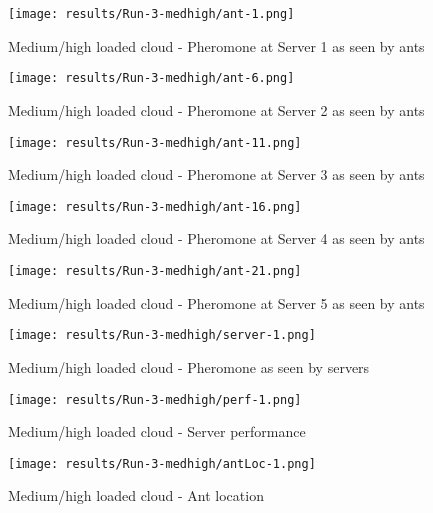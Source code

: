 \begin{figure}[!ht]
	\centering
		\texttt{[image: results/Run-3-medhigh/ant-1.png]}
	\caption{Medium/high loaded cloud - Pheromone at Server 1 as seen by ants}
	\label{fig:3serv-ant1-medhigh}
\end{figure}

\begin{figure}
	\centering
		\texttt{[image: results/Run-3-medhigh/ant-6.png]}
	\caption{Medium/high loaded cloud - Pheromone at Server 2 as seen by ants}
	\label{fig:3serv-ant6-medhigh}
\end{figure}

\begin{figure}
	\centering
		\texttt{[image: results/Run-3-medhigh/ant-11.png]}
	\caption{Medium/high loaded cloud - Pheromone at Server 3 as seen by ants}
	\label{fig:3serv-ant11-medhigh}
\end{figure}

\begin{figure}
	\centering
		\texttt{[image: results/Run-3-medhigh/ant-16.png]}
	\caption{Medium/high loaded cloud - Pheromone at Server 4 as seen by ants}
	\label{fig:3serv-ant16-medhigh}
\end{figure}

\begin{figure}
	\centering
		\texttt{[image: results/Run-3-medhigh/ant-21.png]}
	\caption{Medium/high loaded cloud - Pheromone at Server 5 as seen by ants}
	\label{fig:3serv-ant25-medhigh}
\end{figure}

\begin{figure}
	\centering
		\texttt{[image: results/Run-3-medhigh/server-1.png]}
	\caption{Medium/high loaded cloud - Pheromone as seen by servers}
	\label{fig:3serv-pher-medhigh}
\end{figure}

\begin{figure}
	\centering
		\texttt{[image: results/Run-3-medhigh/perf-1.png]}
	\caption{Medium/high loaded cloud - Server performance}
	\label{fig:3serv-perf-medhigh}
\end{figure}

\begin{figure}
	\centering
		\texttt{[image: results/Run-3-medhigh/antLoc-1.png]}
	\caption{Medium/high loaded cloud - Ant location}
	\label{fig:3serv-antloc-medhigh}
\end{figure}

